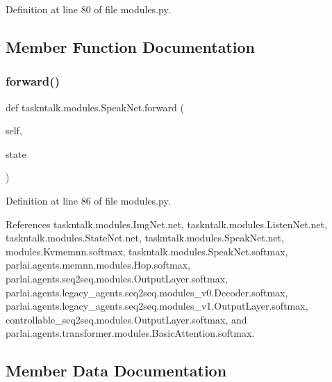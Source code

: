 Definition at line 80 of file modules.\+py.



\subsection{Member Function Documentation}
\mbox{\label{classtaskntalk_1_1modules_1_1SpeakNet_aebb6c91bc72ac69d30628f92c5e0232d}} 
\subsubsection{\texorpdfstring{forward()}{forward()}}
{\footnotesize\ttfamily def taskntalk.\+modules.\+Speak\+Net.\+forward (\begin{DoxyParamCaption}\item[{}]{self,  }\item[{}]{state }\end{DoxyParamCaption})}



Definition at line 86 of file modules.\+py.



References taskntalk.\+modules.\+Img\+Net.\+net, taskntalk.\+modules.\+Listen\+Net.\+net, taskntalk.\+modules.\+State\+Net.\+net, taskntalk.\+modules.\+Speak\+Net.\+net, modules.\+Kvmemnn.\+softmax, taskntalk.\+modules.\+Speak\+Net.\+softmax, parlai.\+agents.\+memnn.\+modules.\+Hop.\+softmax, parlai.\+agents.\+seq2seq.\+modules.\+Output\+Layer.\+softmax, parlai.\+agents.\+legacy\+\_\+agents.\+seq2seq.\+modules\+\_\+v0.\+Decoder.\+softmax, parlai.\+agents.\+legacy\+\_\+agents.\+seq2seq.\+modules\+\_\+v1.\+Output\+Layer.\+softmax, controllable\+\_\+seq2seq.\+modules.\+Output\+Layer.\+softmax, and parlai.\+agents.\+transformer.\+modules.\+Basic\+Attention.\+softmax.



\subsection{Member Data Documentation}
\mbox{\label{classtaskntalk_1_1modules_1_1SpeakNet_a54ceaef3494cf865cb201d08554eb1e2}} 
